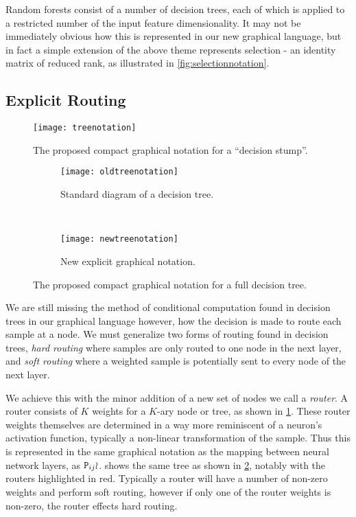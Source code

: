 \documentclass[thesis]{subfiles}
\begin{document}
	Random forests consist of a number of decision trees, each of which is applied to a restricted number of the input feature dimensionality. It may not be immediately obvious how this is represented in our new graphical language, but in fact a simple extension of the above theme represents selection - \ie an identity matrix of reduced rank, as illustrated in \cref{fig:selectionnotation}.
	
	\subsection{Explicit Routing}
	\begin{figure}[htbp!] 
		\centering
		\texttt{[image: treenotation]}
		\caption[Proposed graphical notation for a decision stump.]{The proposed compact graphical notation for a ``decision stump''.}
		\label{fig:treeNotation}
	\end{figure}
	
	\begin{figure}[tbp] 
		\centering
		\begin{subfigure}[b]{0.4\textwidth}
			\centering
			\texttt{[image: oldtreenotation]}
			\caption{Standard diagram of a decision tree.}
			\label{fig:oldtreenotation}
		\end{subfigure}
		~
		\begin{subfigure}[b]{0.4\textwidth}
			\centering
			\texttt{[image: newtreenotation]}
			\caption{New explicit graphical notation.}
			\label{fig:newtreenotation}
		\end{subfigure}
		\caption[Proposed compact graphical notation for a decision tree.]{The proposed compact graphical notation for a full decision tree.}
		\label{fig:complexDecisionTree}
	\end{figure}
	
	We are still missing the method of conditional computation found in decision trees in our graphical language however, \ie how the decision is made to route each sample at a node. We must generalize two forms of routing found in decision trees, \emph{hard routing} where samples are only routed to one node in the next layer, and \emph{soft routing} where a weighted sample is potentially sent to every node of the next layer.
	
	We achieve this with the minor addition of a new set of nodes we call a \emph{router}. A router consists of $K$ weights for a $K$-ary node or tree, as shown in \cref{fig:treeNotation}. These router weights themselves are determined in a way more reminiscent of a neuron's activation function, typically a non-linear transformation of the sample. Thus this is represented in the same graphical notation as the mapping between neural network layers, \ie as $\mat P_{ij} \wr$.  shows the same tree as shown in \cref{fig:oldtreenotation}, notably with the routers highlighted in red. Typically a router will have a number of non-zero weights and perform soft routing, however if only one of the router weights is non-zero, the router effects hard routing.
	
\end{document}
